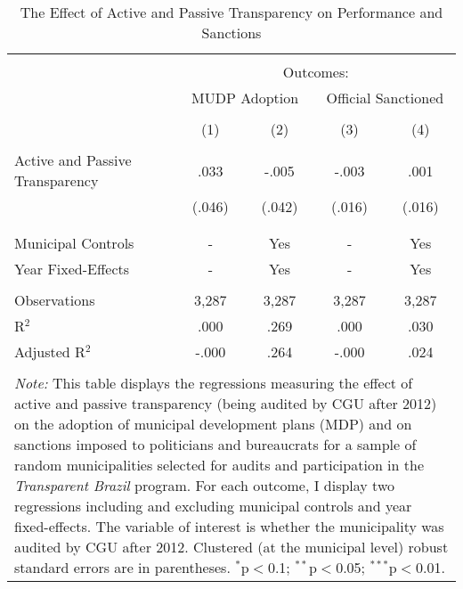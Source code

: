 
\begin{table}[!htbp] \centering
  \caption{The Effect of Active and Passive Transparency on Performance and Sanctions}
  \label{tab:performance3}
\scriptsize
\begin{tabular}{@{\extracolsep{.5cm}}lcccc}
\\[-1.8ex]\hline
\hline \\[-1.8ex]
& \multicolumn{4}{c}{Outcomes:} \T \B \\
\cline{2-5}
 & \multicolumn{2}{c}{MUDP Adoption} & \multicolumn{2}{c}{Official Sanctioned} \T \B \\
\\[-1.8ex] & \multicolumn{1}{c}{(1)} & \multicolumn{1}{c}{(2)} & \multicolumn{1}{c}{(3)} & \multicolumn{1}{c}{(4)}\\
\hline \\[-1.8ex]
Active and Passive Transparency & .033 & -.005 & -.003 & .001 \\
                                & (.046) & (.042) & (.016) & (.016) \\
                                & & & & \\
\hline \\[-1.8ex]
Municipal Controls & \multicolumn{1}{c}{-} & \multicolumn{1}{c}{Yes} & \multicolumn{1}{c}{-} & \multicolumn{1}{c}{Yes} \\
Year Fixed-Effects & \multicolumn{1}{c}{-} & \multicolumn{1}{c}{Yes} & \multicolumn{1}{c}{-} & \multicolumn{1}{c}{Yes} \\
\hline \\[-1.8ex]
Observations & \multicolumn{1}{c}{3,287} & \multicolumn{1}{c}{3,287} & \multicolumn{1}{c}{3,287} & \multicolumn{1}{c}{3,287} \\
R$^{2}$ & \multicolumn{1}{c}{.000} & \multicolumn{1}{c}{.269} & \multicolumn{1}{c}{.000} & \multicolumn{1}{c}{.030} \\
Adjusted R$^{2}$ & \multicolumn{1}{c}{-.000} & \multicolumn{1}{c}{.264} & \multicolumn{1}{c}{-.000} & \multicolumn{1}{c}{.024} \\
\hline
\hline \\[-1.8ex]
\multicolumn{5}{p{.65\textwidth}}{\emph{Note:} This table displays the regressions measuring the effect of active and passive transparency (being audited by CGU after 2012) on the adoption of municipal development plans (MDP) and on sanctions imposed to politicians and bureaucrats for a sample of random municipalities selected for audits and participation in the \emph{Transparent Brazil} program. For each outcome, I display two regressions including and excluding municipal controls and year fixed-effects. The variable of interest is whether the municipality was audited by CGU after 2012. Clustered (at the municipal level) robust standard errors are in parentheses. $^{*}$p$<$0.1; $^{**}$p$<$0.05; $^{***}$p$<$0.01.}
\end{tabular}
\end{table}
